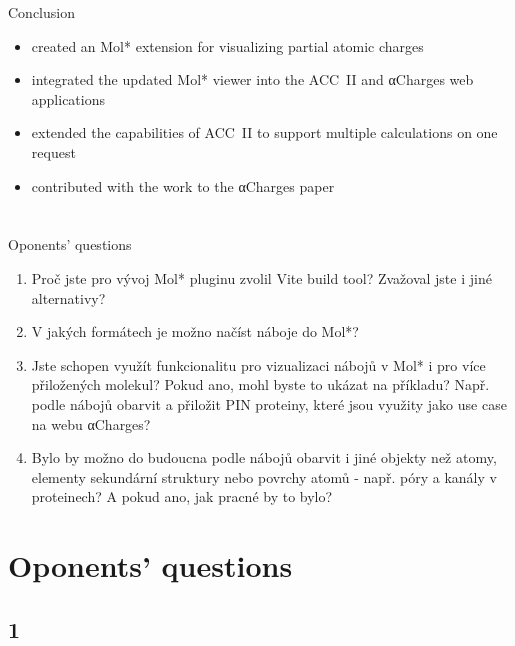 \documentclass[
]{beamer}
\begin{document}
\begin{frame}{Conclusion}
  \begin{itemize}
    \item created an Mol* extension for visualizing partial atomic charges
    \item integrated the updated Mol* viewer into the ACC~II and αCharges web applications
    \item extended the capabilities of ACC~II to support multiple calculations on one request
    \item contributed with the work to the αCharges paper
  \end{itemize}
\end{frame}

\section{}

\begin{frame}{Oponents' questions}
  \begin{enumerate}
    \item Proč jste pro vývoj Mol* pluginu zvolil Vite build tool? Zvažoval jste i jiné alternativy?
    \item V jakých formátech je možno načíst náboje do Mol*?
    \item Jste schopen využít funkcionalitu pro vizualizaci nábojů v Mol* i pro více přiložených molekul? Pokud ano, mohl byste to ukázat na příkladu? Např. podle nábojů obarvit a přiložit PIN proteiny, které jsou využity jako use case na webu αCharges?
    \item Bylo by možno do budoucna podle nábojů obarvit i jiné objekty než atomy, elementy sekundární struktury nebo povrchy atomů - např. póry a kanály v proteinech? A pokud ano, jak pracné by to bylo?
  \end{enumerate}
\end{frame}

\section{Oponents' questions}

\subsection[1]{1}
\end{document}
